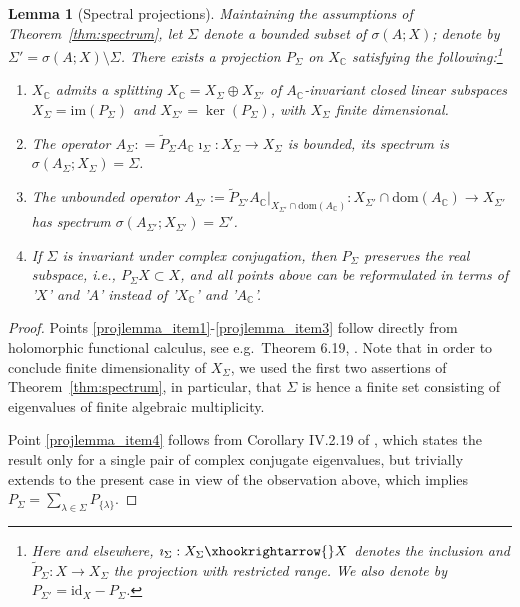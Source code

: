 \documentclass[a4paper, 12pt, oneside, reqno, notitlepage]{amsart}
\theoremstyle{plain}
\newtheorem{lemma}[theorem]{Lemma}
\theoremstyle{definition}
\theoremstyle{remark}
\newcommand{\dom}{\mathrm{dom}}
\newcommand{\im}{\mathrm{im}}
\begin{document}
\begin{lemma}[Spectral projections] \label{lemma:proj}
    Maintaining the assumptions of Theorem~\ref{thm:spectrum},
    let $\Sigma  $ denote a bounded subset of $\sigma(A;X)$; denote by $\Sigma' = \sigma(A;X) \setminus \Sigma$.
    There exists a projection $P_\Sigma$ on $X_\mathbb{C}$ satisfying the following:\footnote{
    Here and elsewhere, $\imath_\Sigma : X_\Sigma \xhookrightarrow{} X$ denotes the inclusion and $\widetilde{P}_\Sigma : X \to X_\Sigma$ the projection with restricted range.
    We also denote by $P_{\Sigma'} = \mathrm{id}_X - P_\Sigma$.
    }
    \begin{enumerate}[label=\upshape{(\roman*)}]
        \item \label{projlemma_item1} $X_\mathbb{C}$ admits a splitting $X_\mathbb{C} = X_\Sigma \oplus X_{\Sigma'}$ of $A_\mathbb{C}$-invariant closed linear subspaces $X_\Sigma = \im (P_\Sigma)$ and $X_{\Sigma'} = \ker(P_\Sigma)$, with $X_\Sigma$ finite dimensional. 
        \item The operator $A_\Sigma : = \widetilde{P}_\Sigma A_\mathbb{C} \imath_\Sigma:X_\Sigma \to X_\Sigma$ is bounded, its spectrum is $\sigma(A_\Sigma ; X_\Sigma) = \Sigma$.
        \item \label{projlemma_item3}  The unbounded operator $A_{\Sigma'} := \widetilde{P}_{\Sigma'} A_\mathbb{C}|_{X_{\Sigma'} \cap \dom(A_\mathbb{C})} : X_{\Sigma'}\cap \dom(A_\mathbb{C}) \to X_{\Sigma'}$ has spectrum $\sigma(A_{\Sigma'} ; X_{\Sigma'}) = \Sigma'$.
        \item \label{projlemma_item4}  If $\Sigma$ is invariant under complex conjugation, then $P_\Sigma$ preserves the real subspace, i.e., $P_\Sigma X \subset X$, and all points above can be reformulated in terms of '$X$' and '$A$' instead of '$X_\mathbb{C}$' and '$A_\mathbb{C}$'.
    \end{enumerate}
\end{lemma} 

\begin{proof}
    Points \ref{projlemma_item1}-\ref{projlemma_item3} follow directly from holomorphic functional calculus, see e.g.\ Theorem 6.19, \cite{buhler2018functional}.
    Note that in order to conclude finite dimensionality of $X_\Sigma$, we used the first two assertions of Theorem~\ref{thm:spectrum}, in particular, that $\Sigma$ is hence a finite set consisting of eigenvalues of finite algebraic multiplicity.
    
    Point \ref{projlemma_item4} follows from Corollary IV.2.19 of \cite{diekmann2012delay}, which states the result only for a single pair of complex conjugate  eigenvalues, but trivially extends to the present case in view of the observation above, which implies $P_\Sigma = \sum_{\lambda \in \Sigma}P_{\{\lambda\}}$.
\end{proof}
\end{document}
